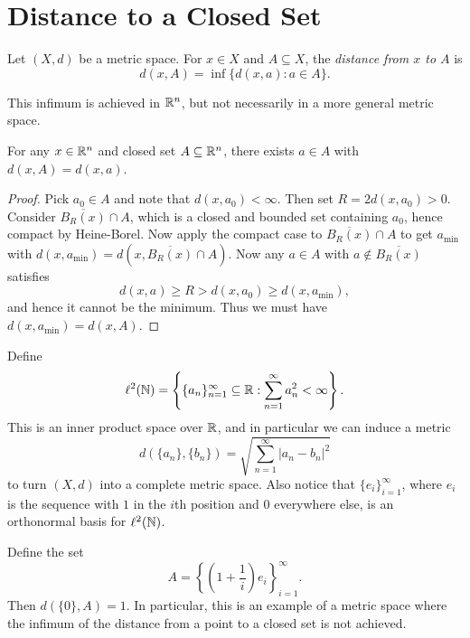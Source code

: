 \section{Distance to a Closed Set}
\begin{definition}
  Let $(X, d)$ be a metric space. For $x \in X$
  and $A \subseteq X$, the \emph{distance from $x$
  to $A$} is
  \[
    d(x, A) = \inf\{d(x, a) : a \in A\}.
  \]
\end{definition}

\begin{remark}
  This infimum is achieved in $\mathbb{R}^n$, but not necessarily in a
  more general metric space.
\end{remark}

\begin{prop}
  For any $x \in \mathbb{R}^n$ and closed set $A \subseteq \mathbb{R}^n$, there
  exists $a \in A$ with $d(x, A) = d(x, a)$.
\end{prop}

\begin{proof}
  Pick $a_0 \in A$ and note that $d(x, a_0) < \infty$.
  Then set $R = 2 d(x, a_0) > 0$. Consider
  $\overline{B_R(x)} \cap A$, which is a closed
  and bounded set containing $a_0$, hence compact by
  Heine-Borel.
  Now apply the compact case to $\overline{B_R(x)} \cap A$
  to get $a_{\text{min}}$ with
  $d(x, a_{\text{min}}) = d(x, \overline{B_R(x)} \cap A)$.
  Now any $a \in A$ with
  $a \notin \overline{B_R(x)}$ satisfies
  \[
    d(x, a) \ge R > d(x, a_0) \ge d(x, a_{\text{min}}),
  \]
  and hence it cannot be the minimum. Thus
  we must have $d(x, a_{\text{min}}) = d(x, A)$.
\end{proof}

\begin{remark}
  Define
  \[
    \ell^2(\mathbb{N}) = \left\{\{a_n\}_{n = 1}^\infty \subseteq \mathbb{R} : \sum_{n = 1}^\infty a_n^2 < \infty\right\}.
  \]
  This is an inner product space over $\mathbb{R}$, and in particular
  we can induce a metric
  \[
    d(\{a_n\}, \{b_n\}) =
    \sqrt{
      \sum_{n = 1}^\infty |a_n - b_n|^2
    }
  \]
  to turn $(X, d)$ into a complete metric space.
  Also notice that $\{e_i\}_{i = 1}^\infty$, where
  $e_i$ is the sequence with $1$ in the $i$th position
  and $0$ everywhere else, is
  an orthonormal basis for $\ell^2(\mathbb{N})$.
\end{remark}

\begin{lemma}
  Define the set
  \[
    A = \left\{\left(1 + \frac{1}{i}\right) e_i\right\}_{i = 1}^\infty.
  \]
  Then $d(\{0\}, A) = 1$. In particular, this is
  an example of a metric space where the infimum
  of the distance from a point to a closed set
  is not achieved.
\end{lemma}


